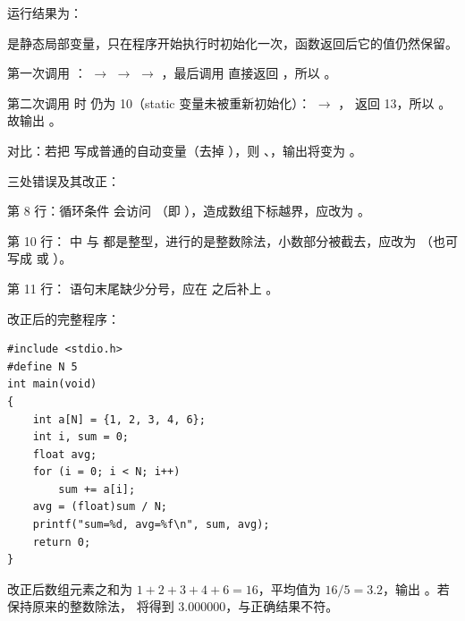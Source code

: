 \documentclass[a4paper,11pt]{article}
\begin{document}
\begin{qgroup}
\q 运行结果为：
\begin{analysis}
 是静态局部变量，只在程序开始执行时初始化一次，函数返回后它的值仍然保留。
\end{analysis}
\begin{analysis}
第一次调用 ： $\rightarrow$  $\rightarrow$  $\rightarrow$ ，最后调用  直接返回 ，所以 。
\end{analysis}
\begin{analysis}
第二次调用  时  仍为 10（static 变量未被重新初始化）： $\rightarrow$ ， 返回 13，所以 。故输出 。
\end{analysis}
\begin{analysis}
对比：若把  写成普通的自动变量（去掉 ），则 、，输出将变为 。
\end{analysis}

\q 三处错误及其改正：
\begin{analysis}
第 8 行：循环条件  会访问 （即 ），造成数组下标越界，应改为 。
\end{analysis}
\begin{analysis}
第 10 行： 中  与  都是整型，进行的是整数除法，小数部分被截去，应改为 （也可写成  或 ）。
\end{analysis}
\begin{analysis}
第 11 行： 语句末尾缺少分号，应在 \code{)} 之后补上 \code{;}。
\end{analysis}
\begin{analysis}
改正后的完整程序：
\end{analysis}
\begin{lstlisting}[language={[custom]C}]
#include <stdio.h>
#define N 5
int main(void)
{
    int a[N] = {1, 2, 3, 4, 6};
    int i, sum = 0;
    float avg;
    for (i = 0; i < N; i++)
        sum += a[i];
    avg = (float)sum / N;
    printf("sum=%d, avg=%f\n", sum, avg);
    return 0;
}
\end{lstlisting}
\begin{analysis}
改正后数组元素之和为 $1+2+3+4+6=16$，平均值为 $16/5=3.2$，输出 。若保持原来的整数除法， 将得到 3.000000，与正确结果不符。
\end{analysis}
\end{qgroup}
\end{document}

